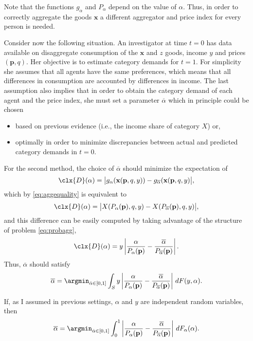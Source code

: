 \documentclass[english, a4paper,12pt]{article}
\begin{document}
Note that the functions $g_{\alpha}$ and $P_{\alpha}$ depend on the value of $\alpha$. Thus, in order to correctly aggregate the goods $\mathbf{x}$ a different aggregator and price index for every person is needed.

Consider now the following situation. An investigator at time $t = 0$ has data available on disaggregate consumption of the $\mathbf{x}$ and $z$ goods, income $y$ and prices $(\mathbf{p},q)$. Her objective is to estimate category demands for $t=1$. For simplicity she assumes that all agents have the same preferences, which means that all differences in consumption are accounted by differences in income. The last assumption also implies that in order to obtain the category demand of each agent and the price index, she must set a parameter $\overline{\alpha}$ which in principle could be chosen
	\begin{itemize}
		\item based on previous evidence (i.e., the income share of category $X$) or,
		\item optimally in order to minimize discrepancies between actual and predicted category demands in $t = 0$.
	\end{itemize}

For the second method, the choice of $\overline{\alpha}$ should minimize the expectation of
	$$\clx{D}(\alpha) = \big| g_{\alpha}(\mathbf{x}(\mathbf{p}, q, y)) - g_{\overline{\alpha}}(\mathbf{x}(\mathbf{p}, q, y) \big|,$$
which by \eqref{eq:aggequality} is equivalent to
	$$\clx{D}(\alpha) = \big| X(P_{\alpha}(\mathbf{p}), q, y) - X(P_{\overline{\alpha}}(\mathbf{p}), q, y) \big|,$$
and this difference can be easily computed by taking advantage of the structure of problem \eqref{eq:probagg},
	$$\clx{D}(\alpha) = y\left| \frac{\alpha}{P_{\alpha}(\mathbf{p})} - \frac{\overline{\alpha}}{P_{\overline{\alpha}}(\mathbf{p})} \right|.$$
Thus, $\overline{\alpha}$ should satisfy
	\[
		\overline{\alpha}
			=	\argmin_{\hat{\alpha} \in [0,1]} 
					\int_{S} y\left| \frac{\alpha}{P_{\alpha}(\mathbf{p})} 
							- \frac{\overline{\alpha}}{P_{\overline{\alpha}}(\mathbf{p})} \right|\, dF(y,\alpha).
	\]
	
If, as I assumed in previous settings, $\alpha$ and $y$ are independent random variables, then
	\begin{equation} \label{eq:overalpha}
		\overline{\alpha}
			=	\argmin_{\hat{\alpha} \in [0,1]} 
					\int_{0}^{1} \left| \frac{\alpha}{P_{\alpha}(\mathbf{p})} 
							- \frac{\overline{\alpha}}{P_{\overline{\alpha}}(\mathbf{p})} \right|\, dF_{\alpha}(\alpha).
	\end{equation}
	
\end{document}
